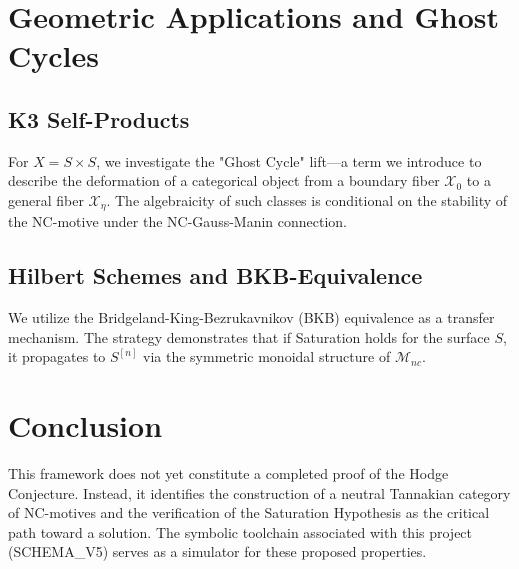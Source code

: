 \documentclass[11pt,a4paper]{article}
\begin{document}
\section{Geometric Applications and Ghost Cycles}
\subsection{K3 Self-Products}
For $X = S \times S$, we investigate the "Ghost Cycle" lift—a term we introduce to describe the deformation of a categorical object from a boundary fiber $\mathcal{X}_0$ to a general fiber $\mathcal{X}_\eta$. The algebraicity of such classes is conditional on the stability of the NC-motive under the NC-Gauss-Manin connection.

\subsection{Hilbert Schemes and BKB-Equivalence}
We utilize the Bridgeland-King-Bezrukavnikov (BKB) equivalence as a transfer mechanism. The strategy demonstrates that if Saturation holds for the surface $S$, it propagates to $S^{[n]}$ via the symmetric monoidal structure of $\mathcal{M}_{nc}$.

\section{Conclusion}
This framework does not yet constitute a completed proof of the Hodge Conjecture. Instead, it identifies the construction of a neutral Tannakian category of NC-motives and the verification of the Saturation Hypothesis as the critical path toward a solution. The symbolic toolchain associated with this project (SCHEMA\_V5) serves as a simulator for these proposed properties.
\end{document}
